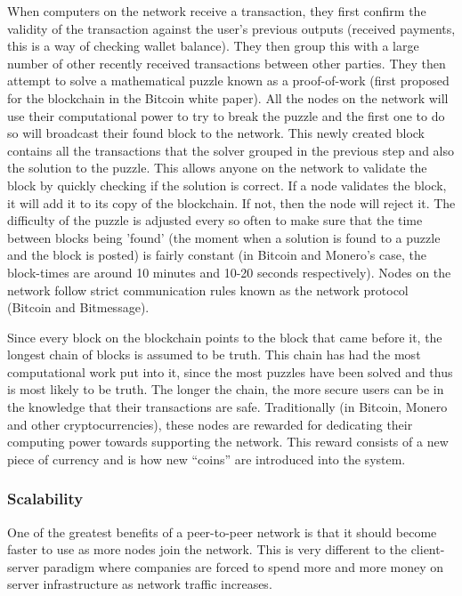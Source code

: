\documentclass{article}
\begin{document}
When computers on the network receive a transaction, they first confirm the validity of the transaction against the user's previous outputs (received payments, this is a way of checking wallet balance). They then group this with a large number of other recently received transactions between other parties. They then attempt to solve a mathematical puzzle known as a proof-of-work (first proposed for the blockchain in the Bitcoin white paper\cite{bitcoin_paper}). All the nodes on the network will use their computational power to try to break the puzzle and the first one to do so will broadcast their found block to the network. This newly created block contains all the transactions that the solver grouped in the previous step and also the solution to the puzzle. This allows anyone on the network to validate the block by quickly checking if the solution is correct. If a node validates the block, it will add it to its copy of the blockchain. If not, then the node will reject it. The difficulty of the puzzle is adjusted every so often to make sure that the time between blocks being 'found' (the moment when a solution is found to a puzzle and the block is posted) is fairly constant (in Bitcoin and Monero's case, the block-times are around 10 minutes and 10-20 seconds respectively). Nodes on the network follow strict communication rules known as the network protocol (Bitcoin\cite{bitcoin_docs} and Bitmessage\cite{bitmessage_docs}).

Since every block on the blockchain points to the block that came before it, the longest chain of blocks is assumed to be truth. This chain has had the most computational work put into it, since the most puzzles have been solved and thus is most likely to be truth. The longer the chain, the more secure users can be in the knowledge that their transactions are safe. Traditionally (in Bitcoin, Monero and other cryptocurrencies), these nodes are rewarded for dedicating their computing power towards supporting the network. This reward consists of a new piece of currency and is how new ``coins'' are introduced into the system.

\subsubsection{Scalability}
One of the greatest benefits of a peer-to-peer network is that it should become faster to use as more nodes join the network. This is very different to the client-server paradigm where companies are forced to spend more and more money on server infrastructure as network traffic increases.
\end{document}
